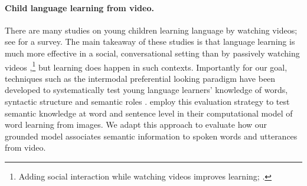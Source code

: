 \paragraph{Child language learning from video.}
There are many studies on young children learning language by watching
videos; see \citet{vanderplank2010deja} for a survey. The main takeaway
of these studies is that language learning is much more effective in a
social, conversational setting than by passively watching videos
\cite{kuhl2003foreign,anderson2005television,robb2009just},\footnote{Adding
social interaction while watching videos improves learning;
\citet{lytle2018two}.} but learning does happen in such
contexts. Importantly for our goal, techniques such as the intermodal
preferential looking paradigm have been developed to systematically test young 
language learners' knowledge of words, syntactic structure and semantic roles
\cite{hirsh1996intermodal,bergelson20126,noble2011comprehension}.
\citet{nikolaus-fourtassi-2021-evaluating}
employ this evaluation strategy to test semantic knowledge at word and
sentence level in their computational model of word learning from
images. We adapt this approach to evaluate how our grounded model
associates semantic information to spoken words and utterances from
video.
 
 




